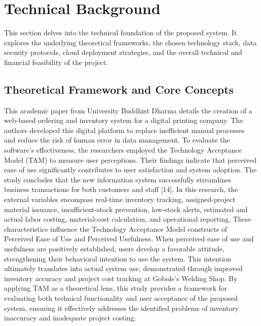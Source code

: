\documentclass[12pt, letterpaper]{article}
\begin{document}
\section{Technical Background}
\hspace*{2em} This section delves into the technical foundation of the proposed system. It explores the underlying theoretical frameworks, the chosen technology stack, data security protocols, cloud deployment strategies, and the overall technical and financial feasibility of the project.

\subsection{Theoretical Framework and Core Concepts}
\hspace*{2em} This academic paper from University Buddhist Dharma details the creation of a web-based ordering and inventory system for a digital printing company. The authors developed this digital platform to replace inefficient manual processes and reduce the risk of human error in data management. To evaluate the software's effectiveness, the researchers employed the Technology Acceptance Model (TAM) to measure user perceptions. Their findings indicate that perceived ease of use significantly contributes to user satisfaction and system adoption. The study concludes that the new information system successfully streamlines business transactions for both customers and staff [14]. 
\hspace*{2em} In this research, the external variables encompass real-time inventory tracking, assigned-project material issuance, insufficient-stock prevention, low-stock alerts, estimated and actual labor costing, material-cost calculation, and operational reporting. These characteristics influence the Technology Acceptance Model constructs of Perceived Ease of Use and Perceived Usefulness.
\hspace*{2em} When perceived ease of use and usefulness are positively established, users develop a favorable attitude, strengthening their behavioral intention to use the system. This intention ultimately translates into actual system use, demonstrated through improved inventory accuracy and project cost tracking at Gobole's Welding Shop. By applying TAM as a theoretical lens, this study provides a framework for evaluating both technical functionality and user acceptance of the proposed system, ensuring it effectively addresses the identified problems of inventory inaccuracy and inadequate project costing.
\end{document}
